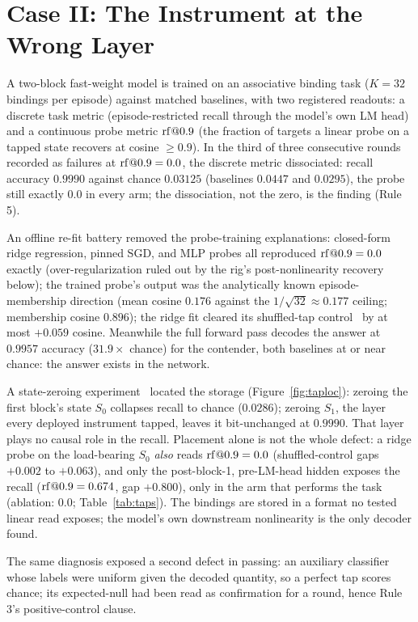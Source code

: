 \section{Case II: The Instrument at the Wrong Layer}
\label{sec:wronglayer}

 A two-block fast-weight model is trained on an associative binding
task ($K=32$ bindings per episode) against matched baselines, with two
registered readouts: a discrete task metric (episode-restricted recall
through the model's own LM head) and a continuous
probe metric $\mathrm{rf}@0.9$ (the fraction of targets a linear probe on a
tapped state recovers at cosine $\geq0.9$). In the third of three
consecutive rounds recorded as failures at $\mathrm{rf}@0.9=0.0$, the discrete
metric dissociated: recall accuracy $0.9990$ against chance $0.03125$
(baselines $0.0447$ and $0.0295$), the probe still exactly $0.0$ in
every arm; the dissociation, not the zero, is the finding (Rule 5).

 An offline re-fit battery removed the probe-training explanations:
closed-form ridge regression, pinned SGD, and MLP probes all
reproduced $\mathrm{rf}@0.9=0.0$ exactly (over-regularization ruled out by the
rig's post-nonlinearity recovery below); the trained probe's
output was the analytically known
episode-membership direction (mean cosine $0.176$ against the
$1/\sqrt{32}\approx0.177$ ceiling; membership cosine $0.896$); the
ridge fit cleared its shuffled-tap control~\citep{hewitt2019control}
by at most $+0.059$
cosine.
Meanwhile the full forward pass decodes the answer at $0.9957$
accuracy ($31.9\times$ chance) for the contender, both baselines at or
near chance: the answer exists in the network.

 A state-zeroing experiment~\citep{elazar2021amnesic} located the
storage
(Figure~\ref{fig:taploc}): zeroing the
first block's state $S_0$ collapses recall to chance ($0.0286$);
zeroing $S_1$, the layer every deployed instrument tapped, leaves it
bit-unchanged at $0.9990$. That layer plays no causal role in the
recall.
Placement alone is not the whole defect: a ridge
probe on the load-bearing $S_0$ \emph{also} reads $\mathrm{rf}@0.9=0.0$
(shuffled-control gaps $+0.002$ to $+0.063$),
and only the post-block-1, pre-LM-head hidden exposes the recall
($\mathrm{rf}@0.9=0.674$, gap $+0.800$), only in the arm that performs
the task (ablation: $0.0$; Table~\ref{tab:taps}).
The bindings are stored in a format no tested linear read exposes;
the model's own downstream nonlinearity is the only decoder found.

The same diagnosis exposed a second defect in passing: an auxiliary
classifier whose labels were uniform given the decoded quantity, so a
perfect tap scores chance; its expected-null had been read as
confirmation for a round, hence Rule 3's positive-control clause.
